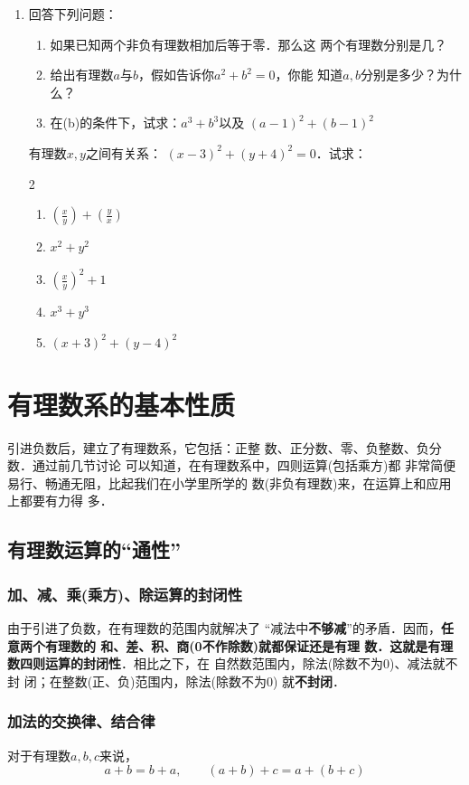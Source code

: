 \begin{enumerate}
	\item  回答下列问题：
	\begin{enumerate}
		\item 如果已知两个非负有理数相加后等于零．那么这
		两个有理数分别是几？
		\item 给出有理数$a$与$b$，假如告诉你$a^2 +b^2=0$，你能
		知道$a, b$分别是多少？为什么？
		\item 在(b)的条件下，试求：$a^3+b^3$以及
		$(a-1)^2+(b-1)^2$
	\end{enumerate}
	
	
	\staritem  有理数$x,  y$之间有关系：
	$(x-3)^2+(y+4)^2=0$．试求：
	\begin{multicols}{2}
		\begin{enumerate}
			\item $\left(\frac{x}{y}\right)+\left(\frac{y}{x}\right)$
			\item $x^2+y^2$
			\item $\left(\frac{x}{y}\right)^2+1$
			\item $x^3+y^3$
			\item $(x+3)^2+(y-4)^2$
		\end{enumerate}
	\end{multicols}
\end{enumerate}

\section{有理数系的基本性质}
引进负数后，建立了有理数系，它包括：正整
数、正分数、零、负整数、负分数．通过前几节讨论
可以知道，在有理数系中，四则运算(包括乘方)都
非常简便易行、畅通无阻，比起我们在小学里所学的
数(非负有理数)来，在运算上和应用上都要有力得
多．

\subsection{有理数运算的“通性”}
\subsubsection{加、减、乘(乘方)、除运算的封闭性}
由于引进了负数，在有理数的范围内就解决了
“减法中\textbf{不够减}”的矛盾．因而，\textbf{任意两个有理数的
	和、差、积、商(0不作除数)就都保证还是有理
	数．这就是有理数四则运算的封闭性}．相比之下，在
自然数范围内，除法(除数不为0)、减法就不封
闭；在整数(正、负)范围内，除法(除数不为0)
就\textbf{不封闭}．

\subsubsection{加法的交换律、结合律}
\begin{blk}{}
	对于有理数$a,b,c$来说，
	\[a+b=b+a,\qquad (a+b)+c=a+(b+c)\]
\end{blk}

